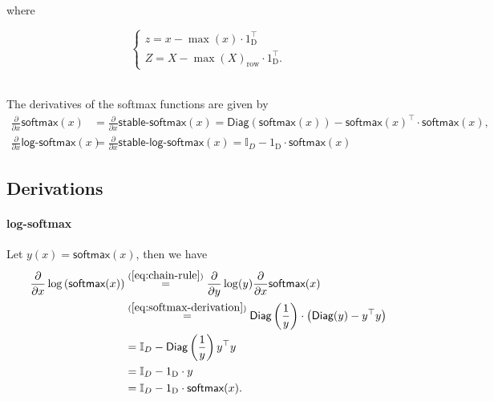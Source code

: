 \documentclass[twoside,11pt]{article}
\newcommand{\const}[1]{\ensuremath{\mathrm{#1}}} %
\newcommand{\func}[1]{\ensuremath{\textsf{#1}}} %
\newcommand{\Partial}[1]{\frac{\partial}{\partial #1}}
\begin{document}
\ \\
where

\[
    \begin{cases*}
    z = x - \max(x) \cdot 1_\const{D}^\top 
    \\
    Z = X - \max(X)_\text{row} \cdot 1_\const{D}^\top.
    \end{cases*}
\]


\ \\
\noindent
The derivatives of the softmax functions are given by
\begin{align}
  \frac{\partial}{\partial x} \func{softmax}(x) &= 
  \frac{\partial}{\partial x} \func{stable-softmax}(x) =
  \func{Diag}(\func{softmax}(x)) - \func{softmax}(x)^\top \cdot \func{softmax}(x),
  \\
  \frac{\partial}{\partial x} \func{log-softmax}(x) &= 
  \frac{\partial}{\partial x} \func{stable-log-softmax}(x) =
  \mathbb{I}_D - 1_\const{D} \cdot \func{softmax}(x)
\end{align}

\subsection{Derivations}

\paragraph{log-softmax}
Let $y(x) = \func{softmax}(x)$, then we have
\begin{align} \label{eq:log-softmax-derivation}
\begin{split}
    \Partial{x} \log \left( \func{softmax}(x) \right)
    & \overset{(\ref{eq:chain-rule})}{=}
    \Partial{y} \log(y) \Partial{x} \func{softmax}(x)
    \\
    & \overset{(\ref{eq:softmax-derivation})}{=}
    \func{Diag}\left(\frac{1}{y}\right) \cdot 
        \left( \func{Diag}(y) -y^\top y \right)
    \\
    &= \mathbb{I}_D - \func{Diag}\left(\frac{1}{y}\right) y^\top y
    \\
    &= \mathbb{I}_D - 1_\const{D} \cdot y
    \\
    &= \mathbb{I}_D - 1_\const{D} \cdot \func{softmax}(x).
\end{split}    
\end{align}
\end{document}
